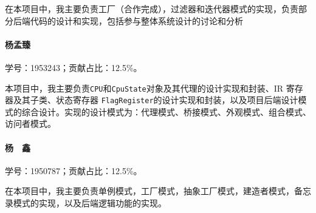 在本项目中，我主要负责工厂（合作完成），过滤器和迭代器模式的实现，负责部分后端代码的设计和实现，包括参与整体系统设计的讨论和分析

\paragraph*{杨孟臻} 学号：1953243；贡献占比：12.5\%。

本项目中，我主要负责\lstinline{CPU}和\lstinline{CpuState}对象及其代理的设计实现和封装、IR 寄存器及其子类、状态寄存器 \lstinline{FlagRegister}的设计实现和封装，以及项目后端设计模式的综合设计。实现的设计模式为：代理模式、桥接模式、外观模式、组合模式、访问者模式。

\paragraph*{杨　鑫} 学号：1950787；贡献占比：12.5\%。

在本项目中，我主要负责单例模式，工厂模式，抽象工厂模式，建造者模式，备忘录模式的实现，以及后端逻辑功能的实现。

